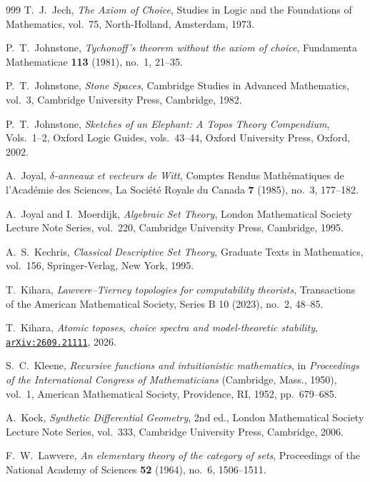 \documentclass[10pt,twoside,openright]{book}
\theoremstyle{crmplain}
\theoremstyle{crmdef}
\theoremstyle{crmremark}
\begin{document}
\begin{thebibliography}{999}
T.~J.~Jech,
\emph{The Axiom of Choice},
Studies in Logic and the Foundations of Mathematics, vol.~75, North-Holland, Amsterdam, 1973.

P.~T.~Johnstone,
\emph{Tychonoff's theorem without the axiom of choice},
Fundamenta Mathematicae \textbf{113} (1981), no.~1, 21--35.

P.~T.~Johnstone,
\emph{Stone Spaces},
Cambridge Studies in Advanced Mathematics, vol.~3, Cambridge University Press, Cambridge, 1982.

P.~T.~Johnstone,
\emph{Sketches of an Elephant: A Topos Theory Compendium},
Vols.~1--2, Oxford Logic Guides, vols.~43--44, Oxford University Press, Oxford, 2002.

A.~Joyal,
\emph{$\delta$-anneaux et vecteurs de Witt},
Comptes Rendus Math\'ematiques de l'Acad\'emie des Sciences, La Soci\'et\'e Royale du Canada \textbf{7} (1985), no.~3, 177--182.

A.~Joyal and I.~Moerdijk,
\emph{Algebraic Set Theory},
London Mathematical Society Lecture Note Series, vol.~220, Cambridge University Press, Cambridge, 1995.

A.~S.~Kechris,
\emph{Classical Descriptive Set Theory},
Graduate Texts in Mathematics, vol.~156, Springer-Verlag, New York, 1995.

T.~Kihara,
\emph{Lawvere--Tierney topologies for computability theorists},
Transactions of the American Mathematical Society, Series B 10 (2023), no.~2, 48--85.

T.~Kihara,
\emph{Atomic toposes, choice spectra and model-theoretic stability},
\href{https://arxiv.org/abs/2609.21111}{\texttt{arXiv:2609.21111}}, 2026.

S.~C.~Kleene,
\emph{Recursive functions and intuitionistic mathematics},
in \emph{Proceedings of the International Congress of Mathematicians} (Cambridge, Mass., 1950), vol.~1, American Mathematical Society, Providence, RI, 1952, pp.~679--685.

A.~Kock,
\emph{Synthetic Differential Geometry},
2nd ed., London Mathematical Society Lecture Note Series, vol.~333, Cambridge University Press, Cambridge, 2006.

F.~W.~Lawvere,
\emph{An elementary theory of the category of sets},
Proceedings of the National Academy of Sciences \textbf{52} (1964), no.~6, 1506--1511.


\end{thebibliography}
\end{document}
